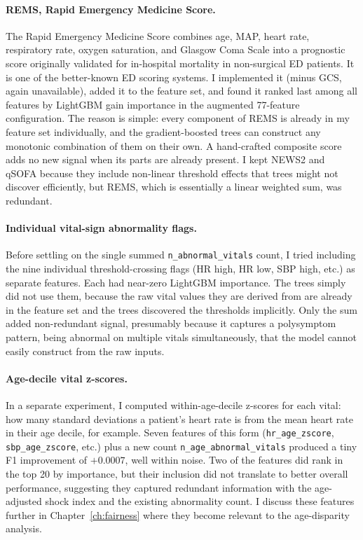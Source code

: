 \paragraph{REMS, Rapid Emergency Medicine Score.} The Rapid Emergency Medicine Score \citep{olsson2003rems} combines age, MAP, heart rate, respiratory rate, oxygen saturation, and Glasgow Coma Scale into a prognostic score originally validated for in-hospital mortality in non-surgical ED patients. It is one of the better-known ED scoring systems. I implemented it (minus GCS, again unavailable), added it to the feature set, and found it ranked last among all features by LightGBM gain importance in the augmented 77-feature configuration. The reason is simple: every component of REMS is already in my feature set individually, and the gradient-boosted trees can construct any monotonic combination of them on their own. A hand-crafted composite score adds no new signal when its parts are already present. I kept NEWS2 and qSOFA because they include non-linear threshold effects that trees might not discover efficiently, but REMS, which is essentially a linear weighted sum, was redundant.

\paragraph{Individual vital-sign abnormality flags.} Before settling on the single summed \texttt{n\_abnormal\_vitals} count, I tried including the nine individual threshold-crossing flags (HR high, HR low, SBP high, etc.) as separate features. Each had near-zero LightGBM importance. The trees simply did not use them, because the raw vital values they are derived from are already in the feature set and the trees discovered the thresholds implicitly. Only the sum added non-redundant signal, presumably because it captures a polysymptom pattern, being abnormal on multiple vitals simultaneously, that the model cannot easily construct from the raw inputs.

\paragraph{Age-decile vital z-scores.} In a separate experiment, I computed within-age-decile z-scores for each vital: how many standard deviations a patient's heart rate is from the mean heart rate in their age decile, for example. Seven features of this form (\texttt{hr\_age\_zscore}, \texttt{sbp\_age\_zscore}, etc.) plus a new count \texttt{n\_age\_abnormal\_vitals} produced a tiny F1 improvement of $+0.0007$, well within noise. Two of the features did rank in the top 20 by importance, but their inclusion did not translate to better overall performance, suggesting they captured redundant information with the age-adjusted shock index and the existing abnormality count. I discuss these features further in Chapter~\ref{ch:fairness} where they become relevant to the age-disparity analysis.

